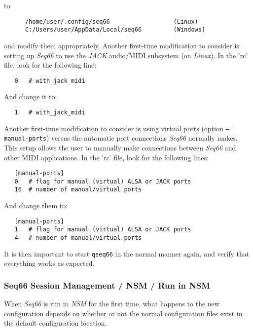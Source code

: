   to

   \begin{verbatim}
      /home/user/.config/seq66                  (Linux)
      C:/Users/user/AppData/Local/seq66         (Windows)
   \end{verbatim}

   and modify them appropriately.
   Another first-time modification to consider is setting up \textsl{Seq66} to
   use the \textsl{JACK} audio/MIDI subsystem (on \textsl{Linux}).
   In the 'rc' file, look for the following line:

\begin{verbatim}
   0   # with_jack_midi
\end{verbatim}

   And change it to:

\begin{verbatim}
   1   # with_jack_midi
\end{verbatim}

   Another first-time modification to consider is using virtual ports (option
   \texttt{--manual-ports}) versus the automatic port connections
   \textsl{Seq66} normally makes.
   This setup allows the user to manually make connections between
   \textsl{Seq66} and other MIDI applications.
   In the 'rc' file, look for the following lines:

\begin{verbatim}
   [manual-ports]
   0   # flag for manual (virtual) ALSA or JACK ports
   16  # number of manual/virtual ports
\end{verbatim}

   And change them to:

\begin{verbatim}
   [manual-ports]
   1   # flag for manual (virtual) ALSA or JACK ports
   4   # number of manual/virtual ports
\end{verbatim}

   It is then important to start \texttt{qseq66} in the normal manner again,
   and verify that everything works as expected.

\subsubsection{Seq66 Session Management / NSM / Run in NSM}
\label{subsec:sessions_nsm_first_run_in_nsm}

   When \textsl{Seq66} is run in \textsl{NSM} for the first time,
   what happens to the new configuration depends on whether or not 
   the normal configuration files exist in the default configuration
   location.

